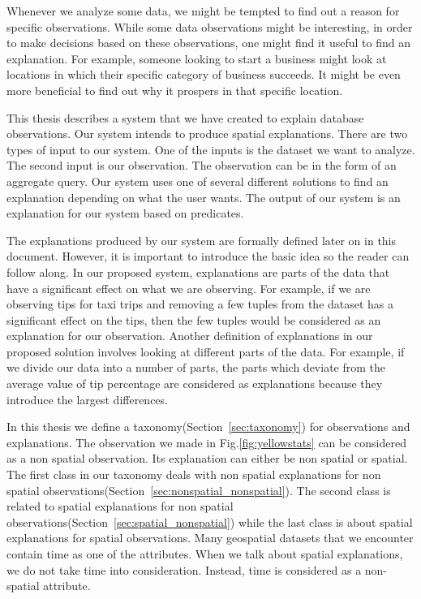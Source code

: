 Whenever we analyze some data, we might be tempted to find out a reason for specific observations. While some data observations might be interesting, in order to make decisions based on these observations, one might find it useful to find an explanation. For example, someone looking to start a business might look at locations in which their specific category of business succeeds. It might be even more beneficial to find out why it prospers in that specific location.

This thesis describes a system that we have created to explain database observations. Our system intends to produce spatial explanations. There are two types of input to our system. One of the inputs is the dataset we want to analyze. The second input is our observation. The observation can be in the form of an aggregate query. Our system uses one of several different solutions to find an explanation depending on what the user wants. The output of our system is an explanation for our system based on predicates.

The explanations produced by our system are formally defined later on in this document. However, it is important to introduce the basic idea so the reader can follow along. In our proposed system, explanations are parts of the data that have a significant effect on what we are observing. For example, if we are observing tips for taxi trips and removing a few tuples from the dataset has a significant effect on the tips, then the few tuples would be considered as an explanation for our observation. Another definition of explanations in our proposed solution involves looking at different parts of the data. For example, if we divide our data into a number of parts, the parts which deviate from the average value of tip percentage are considered as explanations because they introduce the largest differences.

In this thesis we define a taxonomy(Section~\ref{sec:taxonomy}) for observations and explanations.  The observation we made in Fig.\ref{fig:yellowstats} can be considered as a non spatial observation. Its explanation can either be non spatial or spatial. The first class in our taxonomy deals with non spatial explanations for non spatial observations(Section~\ref{sec:nonspatial_nonspatial}). The second class is related to spatial explanations for non spatial observations(Section~\ref{sec:spatial_nonspatial}) while the last class is about spatial explanations for spatial observations. Many geospatial datasets that we encounter contain time as one of the attributes. When we talk about spatial explanations, we do not take time into consideration. Instead, time is considered as a non-spatial attribute.

